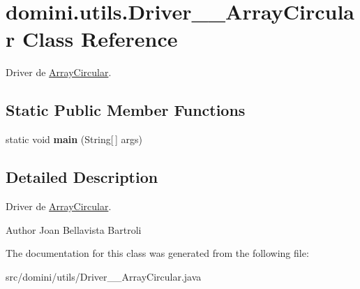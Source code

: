 \hypertarget{classdomini_1_1utils_1_1Driver____ArrayCircular}{}\section{domini.\+utils.\+Driver\+\_\+\+\_\+\+Array\+Circular Class Reference}
\label{classdomini_1_1utils_1_1Driver____ArrayCircular}


Driver de \hyperlink{classdomini_1_1utils_1_1ArrayCircular}{Array\+Circular}.  


\subsection*{Static Public Member Functions}
\begin{DoxyCompactItemize}
\item 
\mbox{\label{classdomini_1_1utils_1_1Driver____ArrayCircular_adf8b1dedd521248da8a5f1425dd27af8}} 
static void {\bfseries main} (String\mbox{[}$\,$\mbox{]} args)
\end{DoxyCompactItemize}


\subsection{Detailed Description}
Driver de \hyperlink{classdomini_1_1utils_1_1ArrayCircular}{Array\+Circular}. 

\begin{DoxyAuthor}{Author}
Joan Bellavista Bartroli 
\end{DoxyAuthor}


The documentation for this class was generated from the following file\+:\begin{DoxyCompactItemize}
\item 
src/domini/utils/Driver\+\_\+\+\_\+\+Array\+Circular.\+java\end{DoxyCompactItemize}
